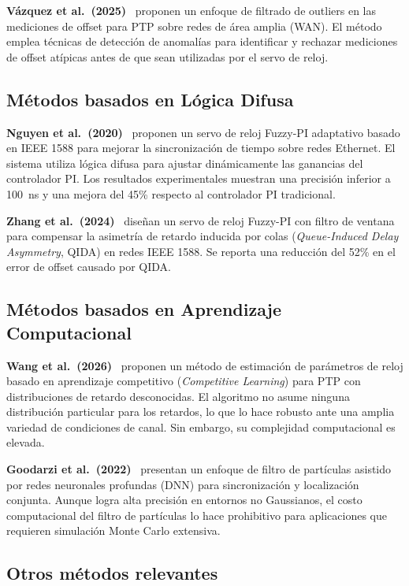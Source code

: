 \textbf{Vázquez et al.\ (2025)}~\cite{vazquez2025} proponen un enfoque de filtrado de outliers en las mediciones de offset para PTP sobre redes de área amplia (WAN). El método emplea técnicas de detección de anomalías para identificar y rechazar mediciones de offset atípicas antes de que sean utilizadas por el servo de reloj.

\subsection{Métodos basados en Lógica Difusa}
\label{sec:2.2.4}

\textbf{Nguyen et al.\ (2020)}~\cite{nguyen2020} proponen un servo de reloj Fuzzy-PI adaptativo basado en IEEE 1588 para mejorar la sincronización de tiempo sobre redes Ethernet. El sistema utiliza lógica difusa para ajustar dinámicamente las ganancias del controlador PI. Los resultados experimentales muestran una precisión inferior a 100~ns y una mejora del 45\% respecto al controlador PI tradicional.

\textbf{Zhang et al.\ (2024)}~\cite{zhang2024} diseñan un servo de reloj Fuzzy-PI con filtro de ventana para compensar la asimetría de retardo inducida por colas (\textit{Queue-Induced Delay Asymmetry}, QIDA) en redes IEEE 1588. Se reporta una reducción del 52\% en el error de offset causado por QIDA.

\subsection{Métodos basados en Aprendizaje Computacional}
\label{sec:2.2.5}

\textbf{Wang et al.\ (2026)}~\cite{wang2026} proponen un método de estimación de parámetros de reloj basado en aprendizaje competitivo (\textit{Competitive Learning}) para PTP con distribuciones de retardo desconocidas. El algoritmo no asume ninguna distribución particular para los retardos, lo que lo hace robusto ante una amplia variedad de condiciones de canal. Sin embargo, su complejidad computacional es elevada.

\textbf{Goodarzi et al.\ (2022)}~\cite{goodarzi2022} presentan un enfoque de filtro de partículas asistido por redes neuronales profundas (DNN) para sincronización y localización conjunta. Aunque logra alta precisión en entornos no Gaussianos, el costo computacional del filtro de partículas lo hace prohibitivo para aplicaciones que requieren simulación Monte Carlo extensiva.

\subsection{Otros métodos relevantes}
\label{sec:2.2.6}

